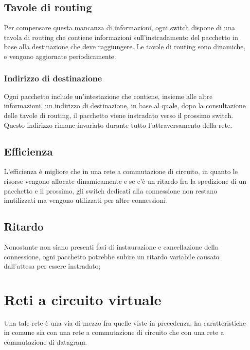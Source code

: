    \subsection{Tavole di routing}
        Per compensare questa mancanza di informazioni, ogni switch dispone di una tavola di routing che contiene informazioni sull'instradamento del pacchetto in base alla destinazione che deve raggiungere. Le tavole di routing sono dinamiche, e vengono aggiornate periodicamente.
        
        \subsubsection{Indirizzo di destinazione}
            Ogni pacchetto include un'intestazione che contiene, insieme alle altre informazioni, un indirizzo di destinazione, in base al quale, dopo la consultazione delle tavole di routing, il pacchetto viene instradato verso il prossimo switch. Questo indirizzo rimane invariato durante tutto l'attraversamento della rete.
        
    \subsection{Efficienza}
        L'efficienza è migliore che in una rete a commutazione di circuito, in quanto le risorse vengono allocate dinamicamente e se c'è un ritardo fra la spedizione di un pacchetto e il prossimo, gli switch dedicati alla connessione non restano inutilizzati ma vengono utilizzati per altre connessioni.
        
    \subsection{Ritardo}
        Nonostante non siano presenti fasi di instaurazione e cancellazione della connessione, ogni pacchetto potrebbe subire un ritardo variabile causato dall'attesa per essere instradato;
        
\section{Reti a circuito virtuale}
    Una tale rete è una via di mezzo fra quelle viste in precedenza; ha caratteristiche in comune sia con una rete a commutazione di circuito che con una rete a commutazione di datagram.
    
